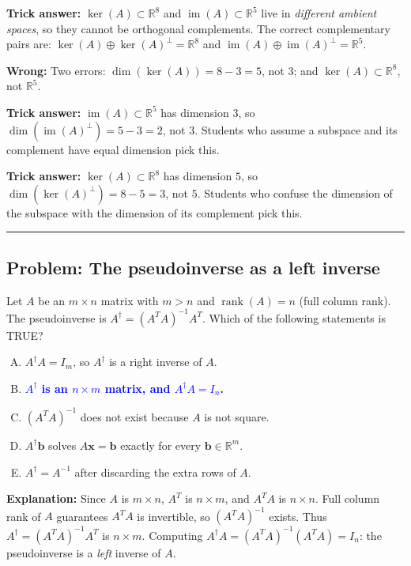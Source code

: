 \documentclass[12pt]{amsart}
\newcommand{\divider}{
  \vspace{-1em}
  \noindent
  \raisebox{-0.15ex}{\textbullet}%
  \hspace{0.5em}%
  \rule[0.5ex]{0.95\textwidth}{1.0pt}%
  \hspace{0.5em}%
  \raisebox{-0.15ex}{\textbullet}%
  \vspace{0em}
}
\begin{document}
\textbf{Trick answer:}
$\ker(A) \subset \mathbb{R}^8$ and $\operatorname{im}(A) \subset \mathbb{R}^5$ live in
\emph{different ambient spaces}, so they cannot be orthogonal complements.
The correct complementary pairs are:
$\ker(A) \oplus \ker(A)^\perp = \mathbb{R}^8$ and
$\operatorname{im}(A) \oplus \operatorname{im}(A)^\perp = \mathbb{R}^5$.

\textbf{Wrong:}
Two errors: $\dim(\ker(A)) = 8 - 3 = 5$, not $3$; and $\ker(A) \subset \mathbb{R}^8$,
not $\mathbb{R}^5$.

\textbf{Trick answer:}
$\operatorname{im}(A) \subset \mathbb{R}^5$ has dimension $3$, so
$\dim(\operatorname{im}(A)^\perp) = 5-3 = 2$, not $3$.
Students who assume a subspace and its complement have equal dimension pick this.

\textbf{Trick answer:}
$\ker(A) \subset \mathbb{R}^8$ has dimension $5$, so
$\dim(\ker(A)^\perp) = 8 - 5 = 3$, not $5$.
Students who confuse the dimension of the subspace with the dimension of its
complement pick this.

\divider

\subsection*{Problem: The pseudoinverse as a left inverse}

Let $A$ be an $m\times n$ matrix with $m > n$ and $\operatorname{rank}(A) = n$
(full column rank).
The pseudoinverse is $A^\dagger = (A^TA)^{-1}A^T$.
Which of the following statements is TRUE?

\begin{enumerate}[(A)]
\item $A^\dagger A = I_m$, so $A^\dagger$ is a right inverse of $A$.
\item \textcolor{blue}{\textbf{$A^\dagger$ is an $n\times m$ matrix, and $A^\dagger A = I_n$.}}
\item $(A^TA)^{-1}$ does not exist because $A$ is not square.
\item $A^\dagger \mathbf{b}$ solves $A\mathbf{x} = \mathbf{b}$ exactly for every $\mathbf{b} \in \mathbb{R}^m$.
\item $A^\dagger = A^{-1}$ after discarding the extra rows of $A$.
\end{enumerate}

\textbf{Explanation:}
Since $A$ is $m\times n$, $A^T$ is $n\times m$, and $A^TA$ is $n\times n$.
Full column rank of $A$ guarantees $A^TA$ is invertible, so $(A^TA)^{-1}$
exists.
Thus $A^\dagger = (A^TA)^{-1}A^T$ is $n\times m$.
Computing $A^\dagger A = (A^TA)^{-1}(A^TA) = I_n$: the pseudoinverse is a
\emph{left} inverse of $A$.
\end{document}
